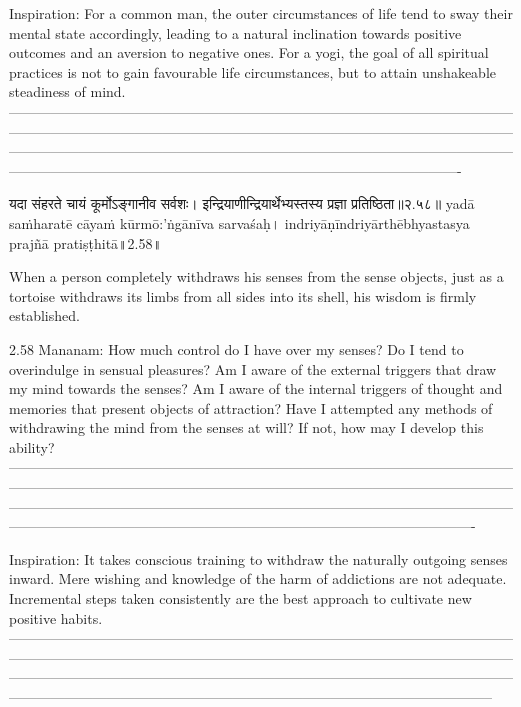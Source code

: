 Inspiration:
For a common man, the outer circumstances of life tend to sway their mental state accordingly, leading to a natural inclination towards positive outcomes and an aversion to negative ones.
For a yogi, the goal of all spiritual practices is not to gain favourable life circumstances, but to attain unshakeable steadiness of mind.
—----------------------------------------------------------------------------------------------------------------------------------------------------------------------------------------------------------------------------------------------------------------------------------------------------------------------------------------------------------------------------------------------------------------------------------



यदा संहरते चायं कूर्मोऽङ्गानीव सर्वशः। 
इन्द्रियाणीन्द्रियार्थेभ्यस्तस्य प्रज्ञा प्रतिष्ठिता॥२.५८॥
yadā saṁharatē cāyaṁ kūrmō:'ṅgānīva sarvaśaḥ। 
indriyāṇīndriyārthēbhyastasya prajñā pratiṣṭhitā॥2.58॥

When a person completely withdraws his senses from the sense objects, just as a tortoise withdraws its limbs from all sides into its shell,  his wisdom is firmly established.

2.58 Mananam:
How much control do I have over my senses? Do I tend to overindulge in sensual pleasures? Am I aware of the external triggers that draw my mind towards the senses? Am I aware of the internal triggers of thought and memories that present objects of attraction? Have I attempted any methods of withdrawing the mind from the senses at will? If not, how may I develop this ability?
—-------------------------------------------------------------------------------------------------------------------------------------------------------------------------------------------------------------------------------------------------------------------------------------------------------------------------------------------------------------------------------------------------------------------------------------

Inspiration:
It takes conscious training to withdraw the naturally outgoing senses inward. Mere wishing and knowledge of the harm of addictions are not adequate. Incremental steps taken consistently are the best approach to cultivate new positive habits.
—-----------------------------------------------------------------------------------------------------------------------------------------------------------------------------------------------------------------------------------------------------------------------------------------------------------------------------------------------------------------------------------------------------------------------------------------



